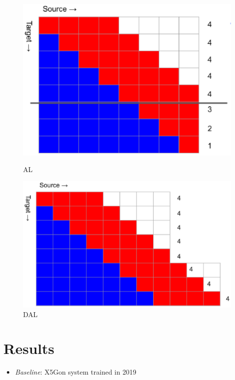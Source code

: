 \documentclass[landscape]{article}
\begin{document}
\begin{figure}[!htb]
  \includegraphics[width=\linewidth]{figures/AL}
  \caption*{AL}
\endminipage\hfill
{}
  \includegraphics[width=\linewidth]{figures/DAL}
  \caption*{DAL}
\endminipage
\end{figure}

\cp
\section{Results}
\vspace*{10mm}
\begin{itemize}
	\item \textit{Baseline}: X5Gon system trained in 2019
\end{itemize}
\vspace*{-10mm}
\end{document}
